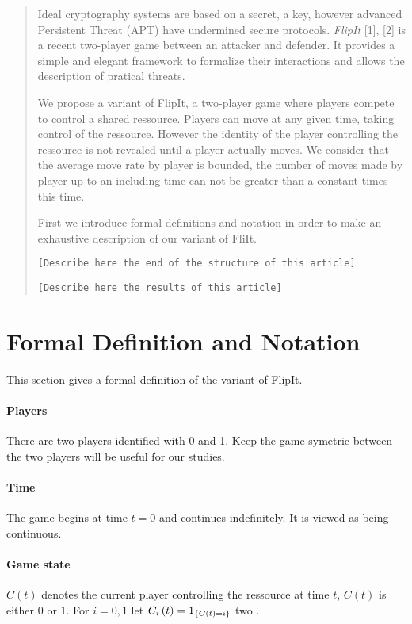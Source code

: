 


\maketitle

\begin{abstract}
Ideal cryptography systems are based on a secret, a key, however advanced Persistent
Threat (APT) have undermined secure protocols. \emph{FlipIt} [1], [2] is a recent
two-player game between an attacker and defender. It provides a simple and elegant
framework to formalize their interactions and allows the description of pratical
threats.

We propose a variant of FlipIt, a two-player game where players compete to control
a shared ressource. Players can move at any given time, taking control of the
ressource. However the identity of the player controlling the ressource is not
revealed until a player actually moves. We consider that the average move rate by
player is bounded, the number of moves made by player up to an including time can
not be greater than a constant times this time.

First we introduce formal definitions and notation in order to make an exhaustive
description of our variant of FliIt.

\texttt{[Describe here the end of the structure of this article]}

\texttt{[Describe here the results of this article]}
\end{abstract}


\section{Formal Definition and Notation}
This section gives a formal definition of the variant of FlipIt.

\paragraph{Players}
There are two players identified with 0 and 1. Keep the game symetric between the
two players will be useful for our studies.

\paragraph{Time}
The game begins at time $ t = 0 $ and continues indefinitely. It is viewed as being
continuous.

\paragraph{Game state}
$ C \left( t \right) $ denotes the current player controlling the ressource at
time $ t $, $ C \left( t \right) $ is either $ 0 $ or $ 1 $. For $i = 0, 1 $ let
$ C_i \left( t \right) = 1_{ \{ C \left( t \right) = i \} } $ two
.

